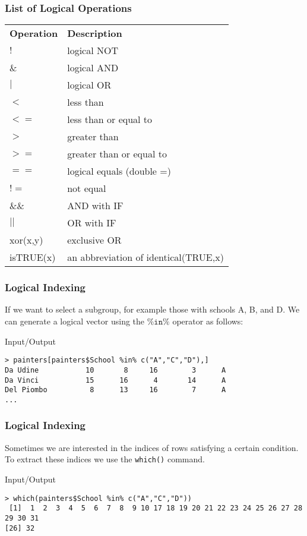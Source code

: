 \documentclass[xcolor={table},c]{beamer}
\begin{document}
\begin{frame}[fragile]\frametitle{List of Logical Operations}
  \begin{tabular}{@{} >{\ttfamily}l p{7cm}} 
    \rowcolor{gray!40}
    \textbf{Operation} & \textbf{Description}\\
$!$ &        logical NOT                         \\
$\&$ &       logical AND                         \\
$|$ &       logical OR                          \\
$<$ &        less than                           \\
$<=$ &       less than or equal to               \\
$>$ &        greater than                        \\
$>=$ &       greater than or equal to            \\
$==$ &       logical equals (double =)           \\
$!=$ &       not equal                           \\
$\&\&$ &     AND with IF                         \\
$||$ &       OR with IF                          \\
xor(x,y) & exclusive OR                        \\
isTRUE(x) & an abbreviation of identical(TRUE,x)\\
\end{tabular}
\end{frame}


\begin{frame}[fragile]\frametitle{Logical Indexing}
If we want to select a subgroup, for example those with schools A, B, and D. We can generate
 a logical vector using the  $\mathtt{\%in\%}$ operator as follows:
\begin{exampleblock}{Input/Output}\small
\begin{verbatim}
> painters[painters$School %in% c("A","C","D"),]
Da Udine           10       8     16        3      A
Da Vinci           15      16      4       14      A
Del Piombo          8      13     16        7      A
...
\end{verbatim}
\end{exampleblock}
\end{frame}

\begin{frame}[fragile]\frametitle{Logical Indexing}
Sometimes we are interested in the indices of rows satisfying a certain condition. To extract these indices we use the \texttt{which()} command.
\begin{exampleblock}{Input/Output}\small
\begin{verbatim}
> which(painters$School %in% c("A","C","D"))
 [1]  1  2  3  4  5  6  7  8  9 10 17 18 19 20 21 22 23 24 25 26 27 28 29 30 31
[26] 32
\end{verbatim}
\end{exampleblock}
\end{frame}
\end{document}
